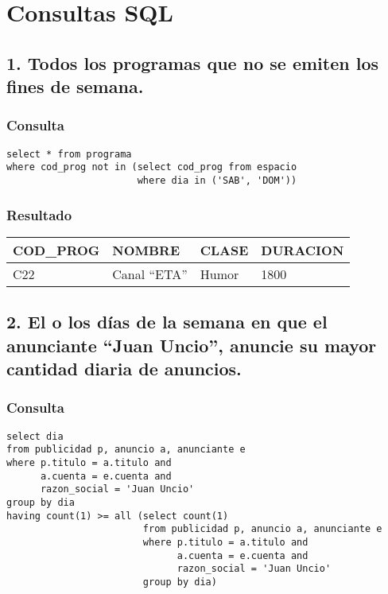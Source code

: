 \section{Consultas SQL}


\subsection*{1. \normalsize{Todos los programas que no se emiten los fines de semana.}}

\subsubsection*{Consulta}
\begin{lstlisting} 
select * from programa
where cod_prog not in (select cod_prog from espacio 
                       where dia in ('SAB', 'DOM'))
\end{lstlisting}

\subsubsection*{Resultado}
\begin{tabular}{|l|l|l|l|}
  \hline
    \bf{COD\_PROG} & \bf{NOMBRE} & \bf{CLASE} & \bf{DURACION} \\ 
  \hline
    C22 & Canal ``ETA'' & Humor & 1800 \\ 
  \hline
\end{tabular} 

\subsection*{2. \normalsize{El o los d\'ias de la semana en que el anunciante ``Juan Uncio'', anuncie su mayor cantidad diaria de anuncios.}}

\subsubsection*{Consulta}
\begin{lstlisting}
select dia 
from publicidad p, anuncio a, anunciante e
where p.titulo = a.titulo and 
      a.cuenta = e.cuenta and 
      razon_social = 'Juan Uncio'
group by dia
having count(1) >= all (select count(1)
                        from publicidad p, anuncio a, anunciante e
                        where p.titulo = a.titulo and 
                              a.cuenta = e.cuenta and
                              razon_social = 'Juan Uncio'
                        group by dia)
\end{lstlisting}

